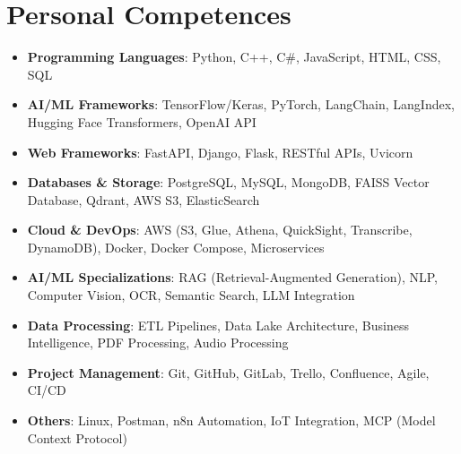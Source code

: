\documentclass[letterpaper,11pt]{article}
\newcommand{\achievementItem}[1]{
  \item\small{
    {#1 \vspace{-3pt}}
  }
}
\begin{document}

\section{Personal Competences}
 \begin{itemize}[leftmargin=0.12in]
  \achievementItem{\textbf{Programming Languages}: Python, C++, C\#, JavaScript, HTML, CSS, SQL}
  \achievementItem{\textbf{AI/ML Frameworks}: TensorFlow/Keras, PyTorch, LangChain, LangIndex, Hugging Face Transformers, OpenAI API}
  \achievementItem{\textbf{Web Frameworks}: FastAPI, Django, Flask, RESTful APIs, Uvicorn}
  \achievementItem{\textbf{Databases \& Storage}: PostgreSQL, MySQL, MongoDB, FAISS Vector Database, Qdrant, AWS S3, ElasticSearch}
  \achievementItem{\textbf{Cloud \& DevOps}: AWS (S3, Glue, Athena, QuickSight, Transcribe, DynamoDB), Docker, Docker Compose, Microservices}
  \achievementItem{\textbf{AI/ML Specializations}: RAG (Retrieval-Augmented Generation), NLP, Computer Vision, OCR, Semantic Search, LLM Integration}
  \achievementItem{\textbf{Data Processing}: ETL Pipelines, Data Lake Architecture, Business Intelligence, PDF Processing, Audio Processing}
  \achievementItem{\textbf{Project Management}: Git, GitHub, GitLab, Trello, Confluence, Agile, CI/CD}
  \achievementItem{\textbf{Others}: Linux, Postman, n8n Automation, IoT Integration, MCP (Model Context Protocol)}
\end{itemize}
 \vspace{-16pt}
\end{document}
